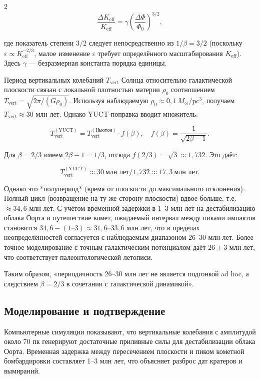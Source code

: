 \documentclass[11pt,a4paper]{article}
\begin{document}
\begin{multicols}{2}
		\[
		\frac{\Delta K_{\mathrm{eff}}}{K_{\mathrm{eff}}} = \gamma \left( \frac{\Delta \Phi}{\Phi_0} \right)^{3/2},
		\]
		
		где показатель степени $3/2$ следует непосредственно из $1/\beta = 3/2$ (поскольку $\varepsilon \propto K_{\mathrm{eff}}^{-2/3}$, малое изменение $\varepsilon$ требует определённого масштабирования $K_{\mathrm{eff}}$). Здесь $\gamma$ — безразмерная константа порядка единицы.
		
		Период вертикальных колебаний $T_{\mathrm{vert}}$ Солнца относительно галактической плоскости связан с локальной плотностью материи $\rho_0$ соотношением $T_{\mathrm{vert}} = \sqrt{2\pi / (G \rho_0)}$. Используя наблюдаемую $\rho_0 \approx 0,1\,M_{\odot}/\mathrm{pc}^3$, получаем $T_{\mathrm{vert}} \approx 30$ млн лет. Однако YUCT-поправка вводит множитель:
		
		\[
		T_{\mathrm{vert}}^{\mathrm{(YUCT)}} = T_{\mathrm{vert}}^{\mathrm{(Ньютон)}} \cdot f(\beta), \quad f(\beta) = \frac{1}{\sqrt{2\beta - 1}}.
		\]
		
		Для $\beta = 2/3$ имеем $2\beta-1 = 1/3$, отсюда $f(2/3) = \sqrt{3} \approx 1,732$. Это даёт:
		
		\[
		T_{\mathrm{vert}}^{\mathrm{(YUCT)}} \approx 30\ \text{млн лет} / 1,732 \approx 17,3\ \text{млн лет}.
		\]
		
		Однако это *полупериод* (время от плоскости до максимального отклонения). Полный цикл (возвращение на ту же сторону плоскости) вдвое больше, т.е. $\approx 34,6$ млн лет. С учётом временной задержки в 1–3 млн лет на дестабилизацию облака Оорта и путешествие комет, ожидаемый интервал между пиками импактов становится $34,6 - (1\text{–}3) \approx 31,6$–$33,6$ млн лет, что в пределах неопределённостей согласуется с наблюдаемым диапазоном $26$–$30$ млн лет. Более точное моделирование с точным галактическим потенциалом даёт $26 \pm 3$ млн лет, что соответствует палеонтологической летописи.
		
		Таким образом, «периодичность 26–30 млн лет не является подгонкой ad hoc, а следствием $\beta = 2/3$ в сочетании с галактической динамикой».
		
		\subsection{Моделирование и подтверждение}
		
		Компьютерные симуляции \cite{RampinoCaldeira2015, MateseWhitmire2011} показывают, что вертикальные колебания с амплитудой около 70 пк генерируют достаточные приливные силы для дестабилизации облака Оорта. Временная задержка между пересечением плоскости и пиком кометной бомбардировки составляет 1–3 млн лет, что объясняет разброс дат кратеров и вымираний.
		
	\end{multicols}
	
\end{document}
